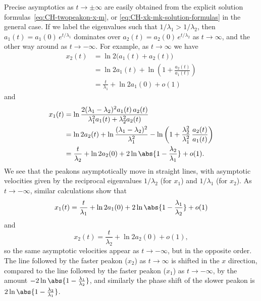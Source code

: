\documentclass[10pt,a4paper]{article} \pdfoutput=1 
\begin{document}
\begin{example}
  Precise asymptotics as $t \to \pm\infty$ are easily obtained from the explicit solution
  formulas~\eqref{eq:CH-twopeakon-x-m},
  or \eqref{eq:CH-xk-mk-solution-formulas} in the general case.
  If we label the eigenvalues such that $1/\lambda_1 > 1/\lambda_2$,
  then $a_1(t) = a_1(0) \, e^{t/\lambda_1}$ dominates over
  $a_2(t) = a_2(0) \, e^{t/\lambda_2}$ as $t \to \infty$, and the other way around as $t \to -\infty$.
  For example, as $t \to \infty$ we have
  \begin{equation}
    \begin{split}
      x_2(t)
      &
      = \ln 2 \bigl( a_1(t) + a_2(t) \bigr)
      \\ &
      = \ln 2 a_1(t) + \ln\left( 1 + \frac{a_2(t)}{a_1(t)} \right)
      \\ &
      = \frac{t}{\lambda_1} + \ln 2 a_1(0) + o(1)
    \end{split}
  \end{equation}
  and
  \begin{equation}
    \begin{split}
      x_1(t)
      &
      = \ln \frac{2 (\lambda_1-\lambda_2)^2 a_1(t) \, a_2(t)}{\lambda_1^2 a_1(t) + \lambda_2 ^2a_2(t)}
      \\ &
      = \ln 2 a_2(t)
      + \ln \frac{(\lambda_1-\lambda_2)^2}{\lambda_1^2}
      - \ln \left( 1 + \frac{\lambda_2^2}{\lambda_1^2} \, \frac{a_2(t)}{a_1(t)} \right)
      \\ &
      = \frac{t}{\lambda_2}
      + \ln 2 a_2(0)
      + 2 \ln \abs{ 1 - \frac{\lambda_2}{\lambda_1} }
      + o(1)
      .
    \end{split}
  \end{equation}
  We see that the peakons asymptotically move in straight lines,
  with asymptotic velocities given by the reciprocal eigenvalues $1/\lambda_2$ (for $x_1$)
  and $1/\lambda_1$ (for $x_2$).
  As $t \to -\infty$, similar calculations show that
  \begin{equation}
    x_1(t) = \frac{t}{\lambda_1}
    + \ln 2 a_1(0)
    + 2 \ln \abs{ 1 - \frac{\lambda_1}{\lambda_2} }
    + o(1)
  \end{equation}
  and
  \begin{equation}
    x_2(t) = \frac{t}{\lambda_2} + \ln 2 a_2(0) + o(1)
    ,
  \end{equation}
  so the same asymptotic velocities appear as $t \to -\infty$, but in the opposite order.
  The line followed by the faster peakon ($x_2$) as $t \to \infty$
  is shifted in the $x$ direction,
  compared to the line followed by the faster peakon ($x_1$) as $t \to -\infty$,
  by the amount
  $-2 \ln \abs{ 1 - \frac{\lambda_1}{\lambda_2} }$,
  and similarly the phase shift of the slower peakon is
  $2 \ln \abs{ 1 - \frac{\lambda_2}{\lambda_1} }$.
\end{example}
\end{document}
